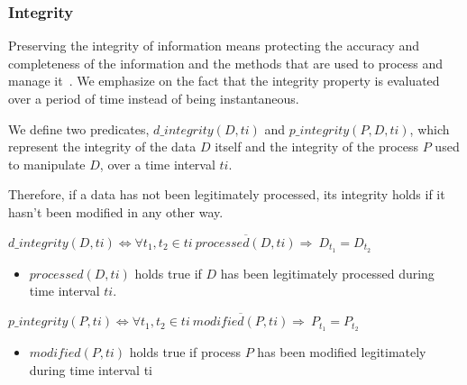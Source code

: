 \subsubsection{Integrity}
\label{sec:prop-int}
 Preserving the integrity of information means protecting the accuracy and completeness of the information and the methods that are used to process and manage it~\cite{ISO/IEC270012013}.
We emphasize on the fact that the integrity property is evaluated over a period of time instead of being instantaneous.

We define two predicates, $d\_integrity(D,ti)$ and $p\_integrity(P,D,ti)$, which represent  the integrity of the data $D$ itself and the integrity of the process $P$ used to manipulate $D$, over a time interval $ti$. 

Therefore, if a data has not been legitimately processed, its integrity holds if it hasn't been modified in any other way.
\begin{myformula}
$d\_integrity(D,ti) \Leftrightarrow \forall t_1,t_2\in ti ~ \overline{processed(D, ti)} \Rightarrow 
~D_{t_1}=D_{t_2}$ 
\end{myformula}

\begin{itemize}
\item $processed(D, ti)$ holds true if $D$ has been legitimately processed during time interval $ti$.

\end{itemize}

\begin{myformula}
$p\_integrity(P, ti) \Leftrightarrow \forall t_1,t_2 \in ti~ \overline{modified(P, ti)}\Rightarrow 
~P_{t_1}=P_{t_2}$
\end{myformula}

\begin{itemize}
\item $modified(P,ti)$ holds true if process $P$ has been modified legitimately during time interval ti
\end{itemize}


